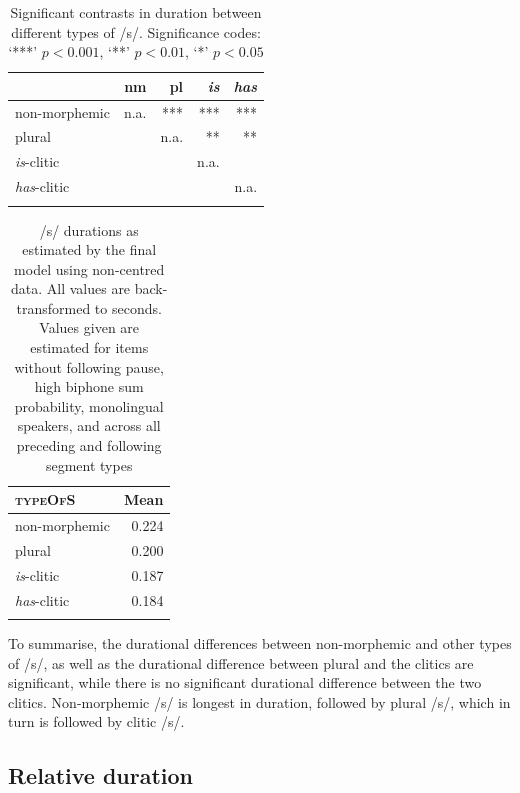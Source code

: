 \begin{table}\fontsize{10}{11}
\caption{Significant contrasts in duration between different types of /s/. Significance codes: `***' $p < 0.001$, `**' $p < 0.01$, `*' $p < 0.05$}
\label{tab:4.7}
\centering
\begin{tabular}{lrrrr} 
\lsptoprule
~                   & nm   & pl   & \textit{is} & \textit{has}  \\ 
\midrule
non-morphemic       & n.a. & ***  & ***         & ***           \\
plural              & ~    & n.a. & **          & **            \\
\textit{is}-clitic  & ~    & ~    & n.a.        & ~             \\
\textit{has}-clitic & ~    & ~    & ~           & n.a.          \\
\lspbottomrule
\end{tabular}
\end{table}



\begin{table}\fontsize{10}{11}
\caption{/s/ durations as estimated by the final model using non-centred data. All values are back-transformed to seconds. Values given are estimated for items without following pause, high biphone sum probability, monolingual speakers, and across all preceding and following segment types}
\label{tab:4.8}
\begin{tabular}{lr} 
\lsptoprule
\textsc{typeOfS}                      & Mean   \\ 
\midrule
non-morphemic                & 0.224  \\
plural                       & 0.200  \\
\textit{is}-clitic           & 0.187  \\
\textit{has}-clitic          & 0.184  \\
\lspbottomrule
\end{tabular}
\end{table}

To summarise, the durational differences between non-morphemic and other types of /s/, as well as the durational difference between plural and the clitics are significant, while there is no significant durational difference between the two clitics. Non-morphemic /s/ is longest in duration, followed by plural /s/, which in turn is followed by clitic /s/.

\subsection{Relative duration}\label{section04_3_2}

